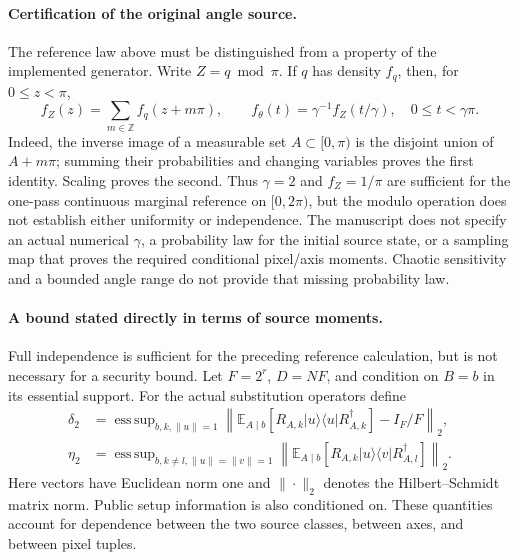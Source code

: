 \documentclass[11pt,a4paper]{article}
\begin{document}
{{\paragraph{Certification of the original angle source.}
The reference law above must be distinguished from a property of the
implemented generator. Write $Z=q\bmod\pi$. If $q$ has density $f_q$,
then, for $0\leq z<\pi$,
\begin{equation}
 f_Z(z)=\sum_{m\in\mathbb Z}f_q(z+m\pi),\qquad
 f_\theta(t)=\gamma^{-1}f_Z(t/\gamma),\quad 0\leq t<\gamma\pi.
 \label{eq:qef_wrapped_source_density}
\end{equation}
Indeed, the inverse image of a measurable set $A\subset[0,\pi)$ is
the disjoint union of $A+m\pi$; summing their probabilities and changing
variables proves the first identity. Scaling proves the second.
Thus $\gamma=2$ and $f_Z=1/\pi$ are sufficient for the one-pass
continuous marginal reference on $[0,2\pi)$, but the modulo operation
does not establish either uniformity or independence. The manuscript
does not specify an actual numerical $\gamma$, a probability law for the
initial source state, or a sampling map that proves the required
conditional pixel/axis moments. Chaotic sensitivity and a bounded angle
range do not provide that missing probability law.

\paragraph{A bound stated directly in terms of source moments.}
Full independence is sufficient for the preceding reference calculation,
but is not necessary for a security bound. Let $F=2^r$, $D=NF$, and
condition on $B=b$ in its essential support. For the actual substitution
operators define
\begin{align}
 \delta_2&=\mathop{\mathrm{ess\,sup}}_{b,k,\|u\|=1}
 \left\|\mathbb E_{A\mid b}
 [R_{A,k}|u\rangle\langle u|R_{A,k}^{\dagger}]-I_F/F\right\|_2,
 \label{eq:qef_actual_diagonal_moment}\\
 \eta_2&=\mathop{\mathrm{ess\,sup}}_{b,k\ne l,\|u\|=\|v\|=1}
 \left\|\mathbb E_{A\mid b}
 [R_{A,k}|u\rangle\langle v|R_{A,l}^{\dagger}]\right\|_2.
 \label{eq:qef_actual_cross_moment}
\end{align}
Here vectors have Euclidean norm one and $\|\cdot\|_2$ denotes the
Hilbert--Schmidt matrix norm. Public setup information is also conditioned
on. These quantities account for dependence between
the two source classes, between axes, and between pixel tuples.

}}
\end{document}

